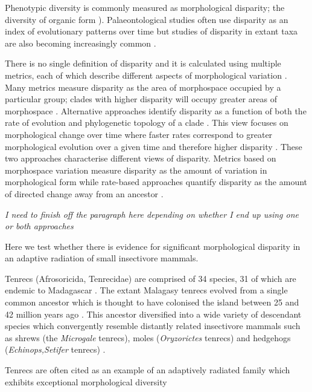 \documentclass[12pt,a4paper]{article}
\begin{document}
Phenotypic diversity is commonly measured as morphological disparity; the diversity of organic form \citep{Foote1997,Erwin2007}). Palaeontological studies often use disparity as an index of evolutionary patterns over time \citep[e.g.][]{Brusatte2008, Ciampaglio2001, Wills1994} but studies of disparity in extant taxa are also becoming increasingly common \citep[e.g.][]{Harmon2003, Collar2011}. 

There is no single definition of disparity and it is calculated using multiple metrics, each of which describe different aspects of morphological variation \citep{Ciampaglio2001}. Many metrics measure disparity as the area of morphospace occupied by a particular group; clades with higher disparity will occupy greater areas of morphospace \citep[e.g.][]{Goswami2011, Brusatte2008}. Alternative approaches identify disparity as a function of both the rate of evolution and phylogenetic topology of a clade \citep{OMeara2006}. This view focuses on morphological change over time where faster rates correspond to greater morphological evolution over a given time and therefore higher disparity \citep{Price2013}. 
These two approaches characterise different views of disparity. Metrics based on morphospace variation measure disparity as the amount of variation in morphological form while rate-based approaches quantify disparity as the amount of directed change away from an ancestor \citep{Zelditch2012}.

\textit{I need to finish off the paragraph here depending on whether I end up using one or both approaches} 



Here we test whether there is evidence for significant morphological disparity in an adaptive radiation of small insectivore mammals.

Tenrecs (Afrosoricida, Tenrecidae) are comprised of 34 species, 31 of which are endemic to Madagascar \citep{Olson2013}. The extant Malagasy tenrecs evolved from a single common ancestor \citep{Asher2006} which is thought to have colonised the island between 25 and 42 million years ago \citep{Samonds2013}. This ancestor diversified into a wide variety of descendant species which convergently resemble distantly related insectivore mammals such as shrews (the \textit{Microgale} tenrecs), moles (\textit{Oryzorictes} tenrecs) and hedgehogs (\textit{Echinops,Setifer} tenrecs) \citep{Eisenberg1969}.

Tenrecs are often cited as an example of an adaptively radiated family which exhibits exceptional morphological diversity \citep{Soarimalala2011, Olson2003, Eisenberg1969}
\end{document}
